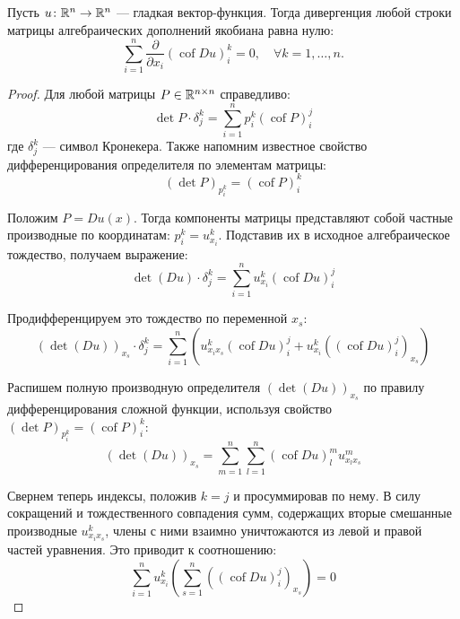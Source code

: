 \begin{lemma}
    Пусть $u \colon \mathbb{R}^n \to \mathbb{R}^n$ --- гладкая вектор-функция. Тогда дивергенция любой строки матрицы алгебраических дополнений якобиана равна нулю:
    \begin{equation}
        \sum_{i=1}^n \frac{\partial}{\partial x_i} (\operatorname{cof} Du)_i^k = 0, \quad \forall k = 1, \dots, n.
    \end{equation}
\end{lemma}
\begin{proof}
Для любой матрицы $P \in \mathbb{R}^{n \times n}$ справедливо:
\begin{equation}
    \det P \cdot \delta_j^k = \sum_{i=1}^n p_i^k (\operatorname{cof} P)_i^j
\end{equation}
где $\delta_j^k$ --- символ Кронекера. Также напомним известное свойство дифференцирования определителя по элементам матрицы:
\begin{equation}
    (\det P)_{p_i^k} = (\operatorname{cof} P)_i^k
\end{equation}

Положим $P = Du(x)$. Тогда компоненты матрицы представляют собой частные производные по координатам: $p_i^k = u^k_{x_i}$. Подставив их в исходное алгебраическое тождество, получаем выражение:
\begin{equation}
    \det(Du) \cdot \delta_j^k = \sum_{i=1}^n u^k_{x_i} (\operatorname{cof} Du)_i^j
\end{equation}

Продифференцируем это тождество по переменной $x_s$:
\begin{equation}
    (\det(Du))_{x_s} \cdot \delta_j^k = \sum_{i=1}^n \left( u^k_{x_i x_s} (\operatorname{cof} Du)_i^j + u^k_{x_i} ((\operatorname{cof} Du)_i^j)_{x_s} \right)
\end{equation}

Распишем полную производную определителя $(\det(Du))_{x_s}$ по правилу дифференцирования сложной функции, используя свойство $(\det P)_{p_i^k} = (\operatorname{cof} P)_i^k$:
\begin{equation}
    (\det(Du))_{x_s} = \sum_{m=1}^n \sum_{l=1}^n (\operatorname{cof} Du)_l^m u^m_{x_l x_s}
\end{equation}

Свернем теперь индексы, положив $k = j$ и просуммировав по нему. В силу 
сокращений и тождественного совпадения сумм, содержащих вторые смешанные 
производные $u^k_{x_i x_s}$, члены с ними взаимно уничтожаются из левой и
правой частей уравнения. Это приводит к соотношению:
\begin{equation}
    \sum_{i=1}^n u^k_{x_i} \left( \sum_{s=1}^n ((\operatorname{cof} Du)_i^j)_{x_s} \right) = 0
\end{equation}


\end{proof}
